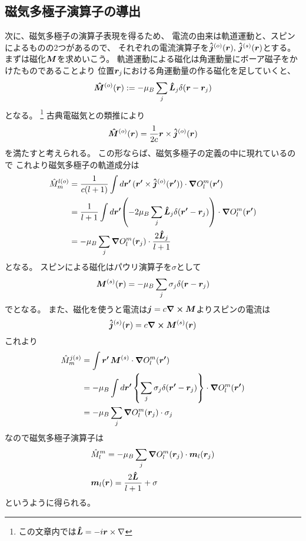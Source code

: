\documentclass[../../master.tex]{subfiles}
\begin{document}
\subsection*{磁気多極子演算子の導出}
次に、磁気多極子の演算子表現を得るため、
電流の由来は軌道運動と、スピンによるものの2つがあるので、
それぞれの電流演算子を\(\vb*{\hat{j}}^{(o)}(\vb*{r}),\,\vb*{\hat{j}}^{(s)}(\vb*{r})\)とする。
まずは磁化\(\vb*{M}\)を求めいこう。
軌道運動による磁化は角運動量にボーア磁子をかけたものであることより
位置\(\vb*{r}_j\)における角運動量の作る磁化を足していくと、
\begin{equation}
    \vb*{\hat{M}}^{(o)}(\vb*{r}) := -\mu_B \sum_{j} \vb*{\hat{L}}_j \delta(\vb*{r}-\vb*{r}_j)
\end{equation}
となる。
\footnote{この文章内では\(\vb*{\hat{L}}=-i\vb*{r}\times \nabla\)}
古典電磁気との類推により
\begin{equation}
    \vb*{\hat{M}}^{(o)}(\vb*{r}) = \frac{1}{2c}\vb*{r}\times \vb*{\hat{j}}^{(o)}(\vb*{r})
\end{equation}
を満たすと考えられる。
この形ならば、磁気多極子の定義の中に現れているので
これより磁気多極子の軌道成分は
\begin{align}
    \hat{M}_m^{l(o)}
    &= \frac{1}{c(l+1)} \int d\vb*{r'}\, (\vb*{r'}\times \vb*{\hat{j}}^{(o)}(\vb*{r'}))\cdot \grad O_l^m(\vb*{r'})\\
    &= \frac{1}{l+1} \int d\vb*{r'} \qty(-2\mu_B \sum_j \vb*{\hat{L}}_j\delta(\vb*{r'}-\vb*{r}_j)) \cdot \grad O_l^m(\vb*{r'})\\
    &= -\mu_B  \sum_j \grad O_l^m(\vb*{r}_j) \cdot \frac{2\vb*{\hat{L}}_j}{l+1}
\end{align}
となる。
スピンによる磁化はパウリ演算子を\(\sigma\)として
\begin{equation}
    \vb*{M}^{(s)}(\vb*{r}) = -\mu_B \sum_j \sigma_j \delta(\vb*{r}-\vb*{r}_j)
\end{equation}
でとなる。
また、磁化を使うと電流は\(\vb*{j}=c\curl\vb*{M}\)よりスピンの電流は
\begin{equation}
    \vb*{\hat{j}}^{(s)}(\vb*{r}) = c \curl \vb*{M}^{(s)}(\vb*{r})
\end{equation}
これより
\begin{align}
    \hat{M}_m^{j(s)}
    &= \int \vb*{r'}\,\vb*{M}^{(s)} \cdot \grad O_l^m(\vb*{r'})\\
    &= -\mu_B  \int d\vb*{r'}\,\qty{\sum_j \sigma_j \delta(\vb*{r'}-\vb*{r}_j)} \cdot \grad O_l^m(\vb*{r'})\\
    &= -\mu_B  \sum_{j}  \grad O_l^m(\vb*{r}_j)\cdot \sigma_j
\end{align}
なので磁気多極子演算子は
\begin{align}
    &\hat{M}_l^m = -\mu_B  \sum_j \grad O_l^m(\vb*{r}_j) \cdot \vb*{m}_l(\vb*{r}_j)\\
    &\vb*{m}_l(\vb*{r}) = \frac{2\vb*{\hat{L}}}{l+1}+\sigma
\end{align}
というように得られる。
\end{document}
